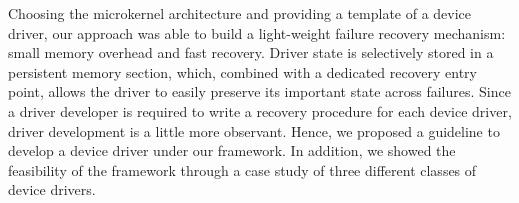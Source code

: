 \documentclass{report}
\begin{document}
Choosing the microkernel architecture and providing a template of a device driver, our approach was able to build a light-weight failure recovery mechanism: small memory overhead and fast recovery.  Driver state is selectively stored in a persistent memory section, which, combined with a dedicated recovery entry point, allows the driver to easily preserve its important state across failures.  Since a driver developer is required to write a recovery procedure for each device driver, driver development is a little more observant.  Hence, we proposed a guideline to develop a device driver under our framework.  In addition, we showed the feasibility of the framework through a case study of three different classes of device drivers.




\end{document}
